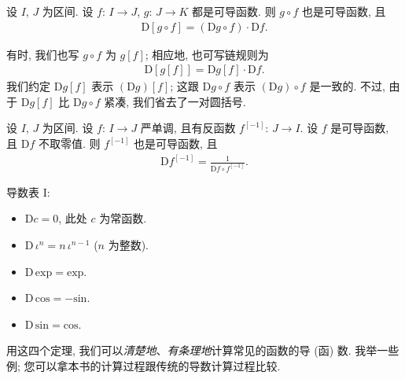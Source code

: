\begin{theorem}
    设 $I$, $J$ 为区间. 设 $f$: $I \to J$, $g$: $J \to K$ 都是可导函数. 则 $g \circ f$ 也是可导函数, 且
    \begin{align*}
        \mathrm{D} [g \circ f] = (\mathrm{D}g \circ f) \cdot \mathrm{D}f.
    \end{align*}
\end{theorem}

\begin{remark}
    有时, 我们也写 $g \circ f$ 为 $g[f]$; 相应地, 也可写链规则为
    \begin{align*}
        \mathrm{D} [g[f]] = \mathrm{D}g[f] \cdot \mathrm{D}f.
    \end{align*}
    我们约定 $\mathrm{D}g[f]$ 表示 $(\mathrm{D}g)[f]$; 这跟 $\mathrm{D}g \circ f$ 表示 $(\mathrm{D}g) \circ f$ 是一致的. 不过, 由于 $\mathrm{D}g[f]$ 比 $\mathrm{D}g \circ f$ 紧凑, 我们省去了一对圆括号.
\end{remark}

\begin{theorem}
    设 $I$, $J$ 为区间. 设 $f$: $I \to J$ 严单调, 且有反函数 $f^{[-1]}$: $J \to I$. 设 $f$ 是可导函数, 且 $\mathrm{D}f$ 不取零值. 则 $f^{[-1]}$ 也是可导函数, 且
    \begin{align*}
        \mathrm{D} f^{[-1]} = \frac{1}{\mathrm{D}f \circ f^{[-1]}}.
    \end{align*}
\end{theorem}

\begin{theorem}
    导数表 I:
    \begin{itemize}
        \item $\mathrm{D} c = 0$, 此处 $c$ 为常函数.
        \item $\mathrm{D}\, \iota^n = n \, \iota^{n - 1}$ ($n$ 为整数).
        \item $\mathrm{D}\, \mathrm{exp} = \mathrm{exp}$.
        \item $\mathrm{D}\, \mathrm{cos} = -\mathrm{sin}$.
        \item $\mathrm{D}\, \mathrm{sin} = \mathrm{cos}$.
    \end{itemize}
\end{theorem}

用这四个定理, 我们可以\emph{清楚地}、\emph{有条理地}计算常见的函数的导 (函) 数. 我举一些例; 您可以拿本书的计算过程跟传统的导数计算过程比较.


